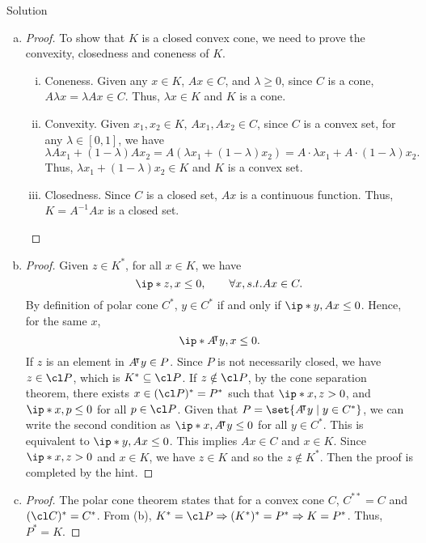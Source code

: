\documentclass{article}
\begin{document}
\begin{solution}
    {Solution}
    \begin{enumerate}[(a)]
        \item {
            \begin{proof}
                To show that $K$ is a closed convex cone, we need to prove the convexity, closedness and coneness of $K$.
                \begin{enumerate}[(i)]
                    \item Coneness. Given any $x\in K$, $Ax\in C$, and $\lambda\geq0$, since $C$ is a cone, $A\lambda x=\lambda Ax\in C$. Thus, $\lambda x\in K$ and $K$ is a cone.
                    \item Convexity. Given $x_1, x_2 \in K$, $Ax_1, Ax_2 \in C$, since $C$ is a convex set, for any $\lambda\in[0, 1]$, we have \[\lambda Ax_1+(1-\lambda)Ax_2=A(\lambda x_1+(1-\lambda)x_2)=A\cdot\lambda x_1+A\cdot(1-\lambda)x_2.\] Thus, $\lambda x_1+(1-\lambda)x_2\in K$ and $K$ is a convex set.
                    \item Closedness. Since $C$ is a closed set, $Ax$ is a continuous function. Thus, $K=A^{-1}Ax$ is a closed set.
                \end{enumerate}
            \end{proof}
        }
        \item {
            \begin{proof}
                Given $z\in K^*$, for all $x\in K$, we have \[\ip*{z,x}\leq 0, \qquad \forall x, s.t. Ax\in C.\] By definition of polar cone $C^*$, $y\in C^*$ if and only if $\ip*{y, Ax}\leq 0$. Hence, for the same $x$, \[\ip*{A\trn y, x}\leq 0.\] If $z$ is an element in $A{}^{\mkern-4mu\intercal} y\in P$. Since $P$ is not necessarily closed, we have $z\in \cl P$, which is $K^*\subseteq \cl P$. If $z\notin \cl P$, by the cone separation theorem, there exists $x\in (\cl P)^*=P^*$ such that $\ip*{x, z}>0$, and $\ip*{x, p}\leq 0$ for all $p\in \cl P$. Given that $P=\set{A\trn y \mid y\in C^*}$, we can write the second condition as $\ip*{x, A\trn y} \leq 0$ for all $y\in C^*$. This is equivalent to $\ip*{y, Ax}\leq 0$. This implies $Ax\in C$ and $x\in K$. Since $\ip*{x, z}>0$ and $x\in K$, we have $z\in K$ and so the $z\notin K^*$. Then the proof is completed by the hint.
            \end{proof}
        }
        \item {
            \begin{proof}
                The polar cone theorem states that for a convex cone $C$, $C^{**}=C$ and $(\cl C)^*=C^*$. From (b), $K^*=\cl P\Rightarrow (K^*)^*=P^*\Rightarrow K=P^*$. Thus, $P^*=K$.
            \end{proof}
        }
    \end{enumerate}
\end{solution}
\end{document}
